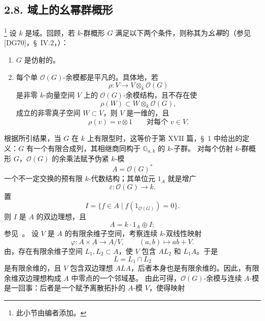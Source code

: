
\subsection*{2.8. 域上的幺幂群概形}
\label{sga3:VIIB:2.8}
\footnote{\label{sga3:VIIB:nde:115}此小节由编者添加。}
设 \(k\) 是域。回顾，若 \(k\)-群概形 \(G\) 满足以下两个条件，则称其为\emph{幺幂}的\textup{（参见 [DG70]，\S~IV.2，）}：
\begin{enumerate}
\item[\textup{(a)}] \(G\) 是仿射的。
\item[\textup{(b)}] 每个单 \(\mathcal O(G)\)-余模都是平凡的。具体地，若
\[
  \rho:V\longrightarrow V\otimes_k\mathcal O(G)
\]
是非零 \(k\)-向量空间 \(V\) 上的 \(\mathcal O(G)\)-余模结构，且不存在使
\[
  \rho(W)\subset W\otimes_k\mathcal O(G),
\]
成立的非零真子空间 \(W\subset V\)，则 \(V\) 是一维的，且
\[
  \rho(v)=v\otimes1
  \qquad\text{对每个 }v\in V.
\]
\end{enumerate}
根据所引结果，当 \(G\) 在 \(k\) 上有限型时，这等价于第 XVII 篇，\S~1 中给出的定义：\(G\) 有一个有限合成列，其相继商同构于 \(\mathbb G_{a,k}\) 的 \(k\)-子群。
对每个仿射 \(k\)-群概形 \(G\)，\(\mathcal O(G)\) 的余乘法赋予伪紧 \(k\)-模
\[
  A=\mathcal O(G)^*
\]
一个不一定交换的预有限 \(k\)-代数结构；其单位元 \(1_A\) 就是增广
\[
  \varepsilon:\mathcal O(G)\longrightarrow k.
\]
置
\[
  I=\{f\in A\mid f(1_{\mathcal O(G)})=0\}.
\]
则 \(I\) 是 \(A\) 的双边理想，且
\[
  A=k\cdot1_A\oplus I;
\]
参见\ 。
设 \(V\) 是 \(A\) 的有限余维子空间，考察连续 \(k\)-双线性映射
\[
  \varphi:A\times A\longrightarrow A/V,
  \qquad
  (a,b)\longmapsto ab+V.
\]
由，存在有限余维子空间 \(L_1,L_2\subset A\)，使 \(V\) 包含 \(AL_2\) 和 \(L_1A\)。于是
\[
  L=L_1\cap L_2
\]
是有限余维的，且 \(V\) 包含双边理想 \(ALA\)，后者本身也是有限余维的。因此，有限余维双边理想构成 \(A\) 中零点的一个邻域基。
由此可得，\(\mathcal O(G)\)-余模与连续 \(A\)-模是一回事：后者是一个赋予离散拓扑的 \(A\)-模 \(V\)，使得映射
